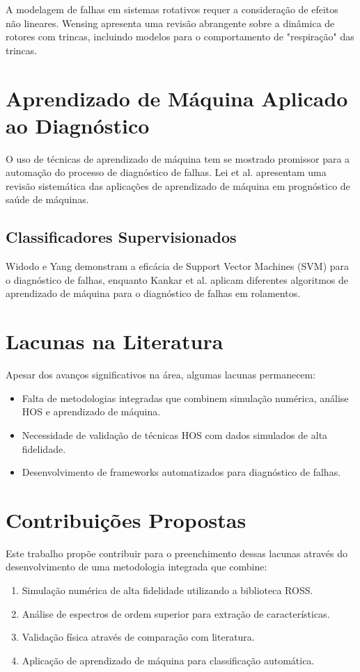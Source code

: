 A modelagem de falhas em sistemas rotativos requer a consideração de efeitos não lineares. Wensing \cite{wensing1997} apresenta uma revisão abrangente sobre a dinâmica de rotores com trincas, incluindo modelos para o comportamento de "respiração" das trincas.

\section{Aprendizado de Máquina Aplicado ao Diagnóstico}

O uso de técnicas de aprendizado de máquina tem se mostrado promissor para a automação do processo de diagnóstico de falhas. Lei et al. \cite{lei2020} apresentam uma revisão sistemática das aplicações de aprendizado de máquina em prognóstico de saúde de máquinas.

\subsection{Classificadores Supervisionados}

Widodo e Yang \cite{widodo2007} demonstram a eficácia de Support Vector Machines (SVM) para o diagnóstico de falhas, enquanto Kankar et al. \cite{kankar2011} aplicam diferentes algoritmos de aprendizado de máquina para o diagnóstico de falhas em rolamentos.

\section{Lacunas na Literatura}

Apesar dos avanços significativos na área, algumas lacunas permanecem:

\begin{itemize}
    \item Falta de metodologias integradas que combinem simulação numérica, análise HOS e aprendizado de máquina.
    \item Necessidade de validação de técnicas HOS com dados simulados de alta fidelidade.
    \item Desenvolvimento de frameworks automatizados para diagnóstico de falhas.
\end{itemize}

\section{Contribuições Propostas}

Este trabalho propõe contribuir para o preenchimento dessas lacunas através do desenvolvimento de uma metodologia integrada que combine:

\begin{enumerate}
    \item Simulação numérica de alta fidelidade utilizando a biblioteca ROSS.
    \item Análise de espectros de ordem superior para extração de características.
    \item Validação física através de comparação com literatura.
    \item Aplicação de aprendizado de máquina para classificação automática.
\end{enumerate}
